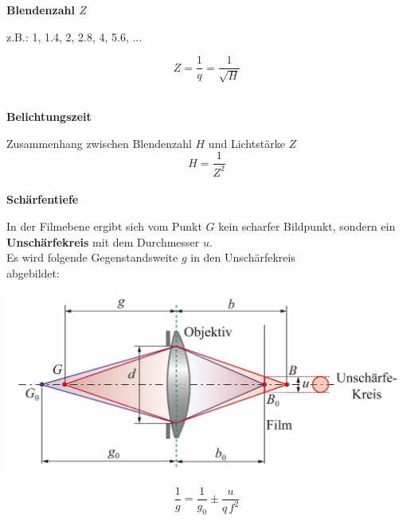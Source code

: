 \textbf{Blendenzahl  $Z$} 

\begin{minipage}{0.48\linewidth}
z.B.: 1, 1.4, 2, 2.8, 4, 5.6, ... \\
\end{minipage}
\hfill
\begin{minipage}{0.48\linewidth}
$$ \boxed{ Z = \frac{1}{q} = \frac{1}{\sqrt{H}}  } $$ \\
\end{minipage}



\textbf{Belichtungszeit} 

Zusammenhang zwischen Blendenzahl $H$ und Lichtstärke $Z$ \\

$$ \boxed{ H = \frac{1}{Z^2} } $$ \\
 


\textbf{Schärfentiefe} 

In der Filmebene ergibt sich vom Punkt $G$ kein scharfer Bildpunkt,
sondern ein \textbf{Unschärfekreis} mit dem Durchmesser $u$. \\


Es wird folgende Gegenstandsweite $g$ in den Unschärfekreis \\
abgebildet:


\begin{minipage}{0.65\linewidth}
\includegraphics[width=\linewidth]{Bilder/Wellen-Optik/schaerfentiefe}
\end{minipage}
\hfill
\begin{minipage}{0.3\linewidth}
$$\boxed{ \frac{1}{g} = \frac{1}{g_0} \pm \frac{u}{q \, f^2}  } $$
\end{minipage}



